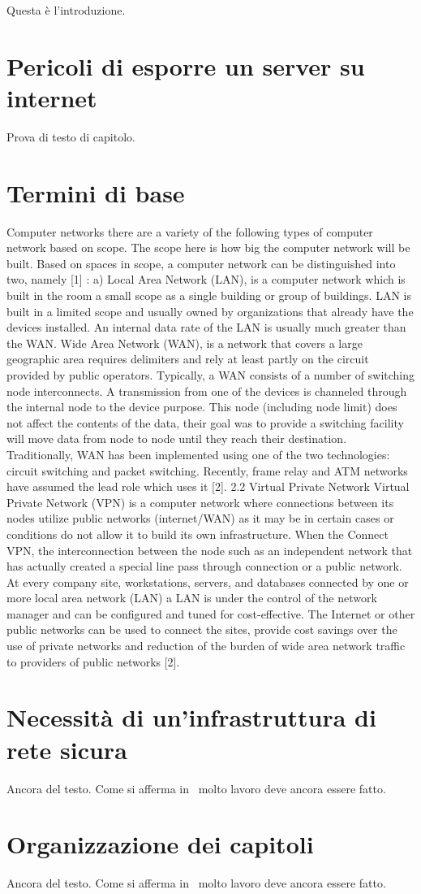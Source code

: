 Questa è l'introduzione.

\section{Pericoli di esporre un server su internet}

Prova di testo di capitolo.

\section{Termini di base}

Computer networks there are a variety of the following types of computer network based on scope. The scope here is how big the computer network will be built. Based on spaces in scope, a computer network can be distinguished into two, namely [1] : a) Local Area Network (LAN), is a computer network which is built in the room a small scope as a single building or group of buildings. LAN is built in a limited scope and usually owned by organizations that already have the devices installed. An internal data rate of the LAN is usually much greater than the WAN. Wide Area Network (WAN), is a network that covers a large geographic area requires delimiters and rely at least partly on the circuit provided by public operators. Typically, a WAN consists of a number of switching node interconnects. A transmission from one of the devices is channeled through the internal node to the device purpose. This node (including node limit) does not affect the contents of the data, their goal was to
provide a switching facility will move data from node to node until they reach their destination. Traditionally, WAN has been implemented using one of the two technologies: circuit switching and packet switching. Recently, frame relay and ATM networks have assumed the lead role which uses it [2].
2.2 Virtual Private Network
Virtual Private Network (VPN) is a computer network where connections between its nodes utilize public networks (internet/WAN) as it may be in certain cases or conditions do not allow it to build its own infrastructure. When the Connect VPN, the interconnection between the node such as an independent network that has actually created a special line pass through connection or a public network. At every company site, workstations, servers, and databases connected by one or more local area network (LAN) a LAN is under the control of the network manager and can be configured and tuned for cost-effective. The Internet or other public networks can be used to connect the sites, provide cost savings over the use of private networks and reduction of the burden of wide area network traffic to providers of public networks [2].

\section{Necessità di un'infrastruttura di rete sicura}

Ancora del testo. Come si afferma in~\cite{jones96analysis} molto lavoro deve ancora essere fatto.

\section{Organizzazione dei capitoli}

Ancora del testo. Come si afferma in~\cite{jones96analysis} molto lavoro deve ancora essere fatto.


